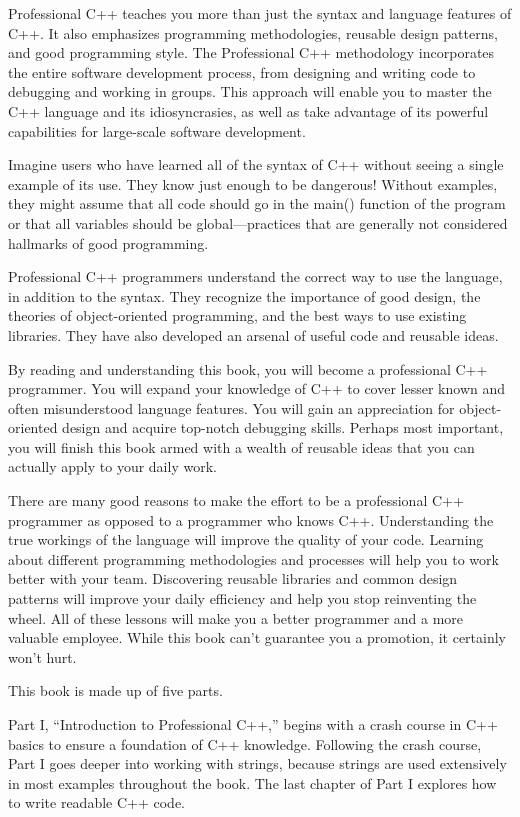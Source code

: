 Professional C++ teaches you more than just the syntax and language features of C++. It also emphasizes programming methodologies, reusable design patterns, and good programming style. The Professional C++ methodology incorporates the entire software development process, from designing and writing code to debugging and working in groups. This approach will enable you to master the C++ language and its idiosyncrasies, as well as take advantage of its powerful capabilities for large-scale software development.

Imagine users who have learned all of the syntax of C++ without seeing a single example of its use. They know just enough to be dangerous! Without examples, they might assume that all code should go in the main() function of the program or that all variables should be global—practices that are generally not considered hallmarks of good programming.

Professional C++ programmers understand the correct way to use the language, in addition to the syntax. They recognize the importance of good design, the theories of object-oriented programming, and the best ways to use existing libraries. They have also developed an arsenal of useful code and reusable ideas.

By reading and understanding this book, you will become a professional C++ programmer. You will expand your knowledge of C++ to cover lesser known and often misunderstood language features. You will gain an appreciation for object-oriented design and acquire top-notch debugging skills. Perhaps most important, you will finish this book armed with a wealth of reusable ideas that you can actually apply to your daily work.

There are many good reasons to make the effort to be a professional C++ programmer as opposed to a programmer who knows C++. Understanding the true workings of the language will improve the quality of your code. Learning about different programming methodologies and processes will help you to work better with your team. Discovering reusable libraries and common design patterns will improve your daily efficiency and help you stop reinventing the wheel. All of these lessons will make you a better programmer and a more valuable employee. While this book can’t guarantee you a promotion, it certainly won’t hurt.


This book is made up of five parts.

Part I, “Introduction to Professional C++,” begins with a crash course in C++ basics to ensure a foundation of C++ knowledge. Following the crash course, Part I goes deeper into working with strings, because strings are used extensively in most examples throughout the book. The last chapter of Part I explores how to write readable C++ code.


